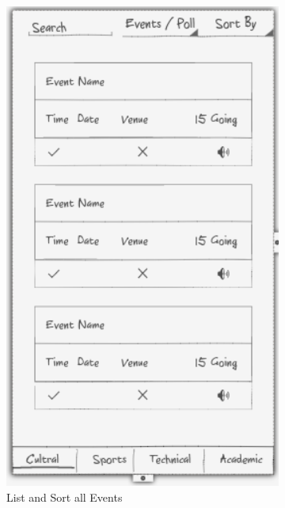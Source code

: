 \documentclass{article}
\begin{document}
\begin{figure}[h]
    \centering
    \includegraphics[scale=0.3]{UV.png}
    \caption{List and Sort all Events}
\end{figure}
\end{document}
